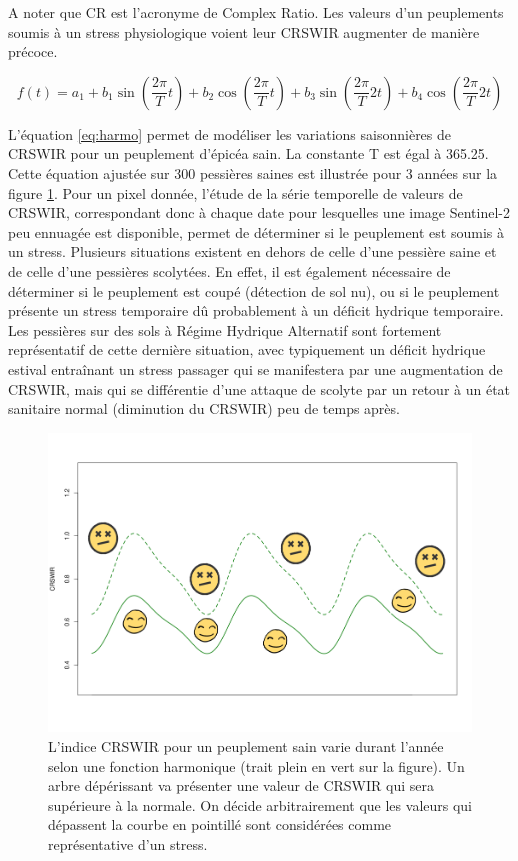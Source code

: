 \documentclass[a4paper, 12pt]{article} %
\begin{document}
A noter que CR est l'acronyme de Complex Ratio.
Les valeurs d'un peuplements soumis à un stress physiologique voient leur CRSWIR augmenter de manière précoce.

\begin{equation}\label{eq:harmo}
 f(t) =   a_{1} + b_{1} \sin(\dfrac{2\pi}{T}t)+ b_{2} \cos(\dfrac{2\pi}{T}t)+ b_{3} \sin(\dfrac{2\pi}{T}2t)+ b_{4} \cos(\dfrac{2\pi}{T}2t)
\end{equation} 

L'équation \ref{eq:harmo} permet de modéliser les variations saisonnières de CRSWIR pour un peuplement d'épicéa sain. La constante T est égal à 365.25. Cette équation ajustée sur 300 pessières saines est illustrée pour 3 années sur la figure \ref{fig:harmo}. Pour un pixel donnée, l'étude de la série temporelle de valeurs de CRSWIR, correspondant donc à chaque date pour lesquelles une image Sentinel-2 peu ennuagée est disponible, permet de déterminer si le peuplement est soumis à un stress. Plusieurs situations existent en dehors de celle d'une pessière saine et de celle d'une pessières scolytées. En effet, il est également nécessaire de déterminer si le peuplement est coupé (détection de sol nu), ou si le peuplement présente un stress temporaire dû probablement à un déficit hydrique temporaire. Les pessières sur des sols à Régime Hydrique Alternatif sont fortement représentatif de cette dernière situation, avec typiquement un déficit hydrique estival entraînant un stress passager qui se manifestera par une augmentation de CRSWIR, mais qui se différentie d'une attaque de scolyte par un retour à un état sanitaire normal (diminution du CRSWIR) peu de temps après.

\begin{figure}[H]
	\centering
	\includegraphics[width=0.9\linewidth]{fctHarmo.png}
	\caption{L'indice CRSWIR pour un peuplement sain varie durant l'année selon une fonction harmonique (trait plein en vert sur la figure). Un arbre dépérissant va présenter une valeur de CRSWIR qui sera supérieure à la normale. On décide arbitrairement que les valeurs qui dépassent la courbe en pointillé sont considérées comme représentative d'un stress. }
	\label{fig:harmo}
\end{figure}
\end{document}
